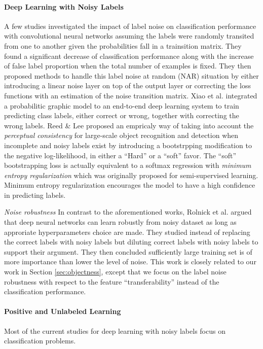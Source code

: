 \paragraph{{Deep Learning with Noisy Labels}}
A few studies\cite{sukhbaatar2014training,patrini2016making} investigated the impact of label noise on classification performance with convolutional neural networks assuming the labels were randomly transited from one to another given the probabilities fall in a trainsition matrix.
They found a significant decrease of classification performance along with the increase of false label proportion when the total number of examples is fixed.
They then proposed methods to handle this label noise at random (NAR)\cite{frenay2014classification} situation by either introducing a linear noise layer on top of the output layer\cite{sukhbaatar2014training} or correcting the loss functions with an estimation of the noise transition matrix\cite{patrini2016making}.
Xiao et al.\cite{xiao2015learning} integrated a probabilitic graphic model to an end-to-end deep learning system to train predicting class labels, either correct or wrong, together with correcting the wrong labels.
Reed \& Lee\cite{reed2014training} proposed an empricaly way of taking into account the \textit{perceptual consistency} for large-scale object recognition and detection when incomplete and noisy labels exist by introducing a bootstrpping modification to the negative log-likelihood, in either a ``Hard'' or a ``soft'' favor.
The ``soft'' bootstrapping loss is actually equivalent to a softmax regression with \textit{minimum entropy regularization}\cite{grandvalet2005semi} which was originally proposed for semi-supervised learning.
Minimum entropy regularization encourages the model to have a high confidence in predicting labels.

\textit{Noise robustness}
In contrast to the aforementioned works, Rolnick et al.\cite{rolnick2017deep} argued that deep neural networks can learn robustly from noisy dataset as long as approriate hyperparameters choice are made.
They studied instead of replacing the correct labels with noisy labels but diluting correct labels with noisy labels to support their argument.
They then concluded sufficiently large training set is of more importance than lower the level of noise.
This work is closely related to our work in Section \ref{sec:objectness}, except that we focus on the label noise robustness with respect to the feature ``transferability'' instead of the classification performance.

\paragraph{Positive and Unlabeled Learning}
Most of the current studies for deep learning with noisy labels focus on classification problems.
